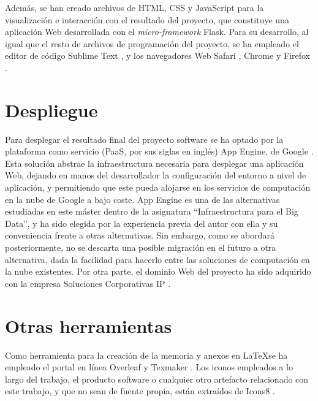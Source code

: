 Además, se han creado archivos de HTML, CSS y JavaScript para la visualización e interacción con el resultado del proyecto, que constituye una aplicación Web desarrollada con el \textit{micro-framework} Flask. Para su desarrollo, al igual que el resto de archivos de programación del proyecto, se ha empleado el editor de código Sublime Text \cite{sublime}, y los navegadores Web Safari \cite{safari}, Chrome \cite{chrome} y Firefox \cite{firefox}.

\section{Despliegue}

Para desplegar el resultado final del proyecto software se ha optado por la plataforma como servicio (PaaS, por sus siglas en inglés) App Engine, de Google \cite{appengine}. Esta solución abstrae la infraestructura necesaria para desplegar una aplicación Web, dejando en manos del desarrollador la configuración del entorno a nivel de aplicación, y permitiendo que este pueda alojarse en los servicios de computación en la nube de Google a bajo coste. App Engine es una de las alternativas estudiadas en este máster dentro de la asignatura ``Infraestructura para el Big Data'', y ha sido elegida por la experiencia previa del autor con ella y su conveniencia frente a otras alternativas. Sin embargo, como se abordará posteriormente, no se descarta una posible migración en el futuro a otra alternativa, dada la facilidad para hacerlo entre las soluciones de computación en la nube existentes. Por otra parte, el dominio Web del proyecto ha sido adquirido con la empresa Soluciones Corporativas IP \cite{dondominio}.

\section{Otras herramientas}

Como herramienta para la creación de la memoria y anexos en \LaTeX \space se ha empleado el portal en línea Overleaf \cite{overleaf} y Texmaker \cite{texmaker}. Los iconos empleados a lo largo del trabajo, el producto software o cualquier otro artefacto relacionado con este trabajo, y que no sean de fuente propia, están extraídos de Icons8 \cite{icons8}.